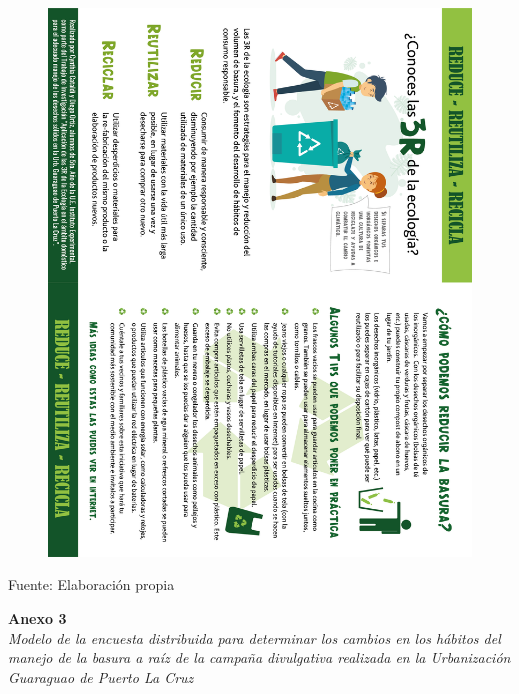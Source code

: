 \begin{figure}[!ht]
    \centering
    \includegraphics[width=17cm, angle=90]{Media/Volante.jpg}
    \label{fig:folleto}
\end{figure}

\setlength{\parindent}{0ex}

Fuente: Elaboración propia

\newpage

\setlength{\parindent}{0ex}

\textbf{Anexo 3} \\
\textit{Modelo de la encuesta distribuida para determinar los cambios en los hábitos del manejo de la basura a raíz de la campaña divulgativa realizada en la Urbanización Guaraguao de Puerto La Cruz}

